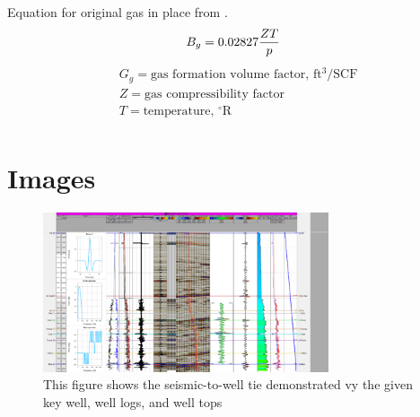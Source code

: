\documentclass[fleqn]{article}
\begin{document}
\noindent
Equation for original gas in place from \cite{Ahmed}.
{\setlength{\mathindent}{0cm}
\begin{equation} \label{eq:GasFormation}
    B_g = 0.02827\frac{ZT}{p} \\
\end{equation}
\begin{equation*}
    \begin{aligned}
    & G_g = \text{gas formation volume factor, ft$^3$/SCF} \\
    & Z = \text{gas compressibility factor} \\
    & T = \text{temperature, $^{\circ}$R} \\
    \end{aligned}
\end{equation*}}

\section{Images}

\begin{figure}[H]
    \centering
    \includegraphics[width=0.75\textwidth]{Images/WellTie Extended.png}
    \caption{This figure shows the seismic-to-well tie demonstrated vy the given key well, well logs, and well tops}
    \label{fig:WellTieZoomed}
\end{figure}

\clearpage
\printbibliography
\end{document}
